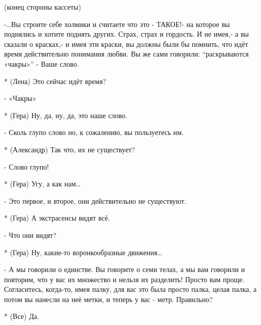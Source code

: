 (конец стороны кассеты)

-…Вы строите себе холмики и считаете что это - ТАКОЕ!- на которое вы поднялись и хотите  поднять других. Страх, страх и гордость. И не имея,- а вы сказали о красках,- и имея эти краски, вы должны были бы помнить, что идёт время действительно понимания любви. Вы же сами говорили: “раскрываются «чакры»” -  Ваше слово.

* (Лена) Это сейчас идёт время?

- «Чакры»

* (Гера) Ну, да, ну, да, это наше слово.

- Сколь глупо слово но, к сожалению, вы пользуетесь им.

* (Александр) Так что, их не существует?

- Слово глупо!

* (Гера) Угу, а как нам…

- Это первое, и второе, они действительно не существуют.

* (Гера) А экстрасенсы видят всё.

- Что они видят?

* (Гера) Ну, какие-то воронкообразные движения…

- А мы говорили о единстве. Вы говорите о семи телах, а мы вам говорили и повторим, что у вас их множество и нельзя их разделить! Просто вам проще. Согласитесь, когда-то, имея палку, для вас это была просто палка, целая палка, а потом вы нанесли на неё метки, и теперь у вас - метр. Правильно? 

* (Все) Да.

